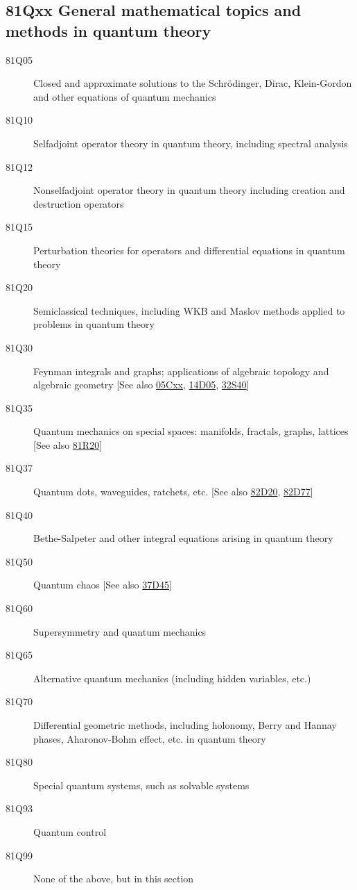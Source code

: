 \documentclass[letterpaper]{article}
\begin{document}
\subsection*{81Qxx  General mathematical topics and methods in quantum theory }\label{81Qxx}
\begin{description}  
\item [81Q05]\label{81Q05} Closed and approximate solutions to the Schr\"{o}dinger, Dirac, Klein-Gordon and other equations of quantum mechanics
\item [81Q10]\label{81Q10} Selfadjoint operator theory in quantum theory, including spectral analysis
\item [81Q12]\label{81Q12} Nonselfadjoint operator theory in quantum theory including creation and destruction operators
\item [81Q15]\label{81Q15} Perturbation theories for operators and differential equations in quantum theory
\item [81Q20]\label{81Q20} Semiclassical techniques, including WKB and Maslov methods applied to problems in quantum theory
\item [81Q30]\label{81Q30} Feynman integrals and graphs; applications of algebraic topology and algebraic geometry [See also \hyperref[05Cxx]{05Cxx}, \hyperref[14D05]{14D05}, \hyperref[32S40]{32S40}]
\item [81Q35]\label{81Q35} Quantum mechanics on special spaces: manifolds, fractals, graphs, lattices [See also \hyperref[81R20]{81R20}]
\item [81Q37]\label{81Q37} Quantum dots, waveguides, ratchets, etc. [See also \hyperref[82D20]{82D20}, \hyperref[82D77]{82D77}]
\item [81Q40]\label{81Q40} Bethe-Salpeter and other integral equations arising in quantum theory
\item [81Q50]\label{81Q50} Quantum chaos [See also \hyperref[37D45]{37D45}]
\item [81Q60]\label{81Q60} Supersymmetry and quantum mechanics
\item [81Q65]\label{81Q65} Alternative quantum mechanics (including hidden variables, etc.)
\item [81Q70]\label{81Q70} Differential geometric methods, including holonomy, Berry and Hannay phases, Aharonov-Bohm effect, etc. in quantum theory
\item [81Q80]\label{81Q80} Special quantum systems, such as solvable systems
\item [81Q93]\label{81Q93} Quantum control
\item [81Q99]\label{81Q99} None of the above, but in this section
\end{description}
\end{document}
